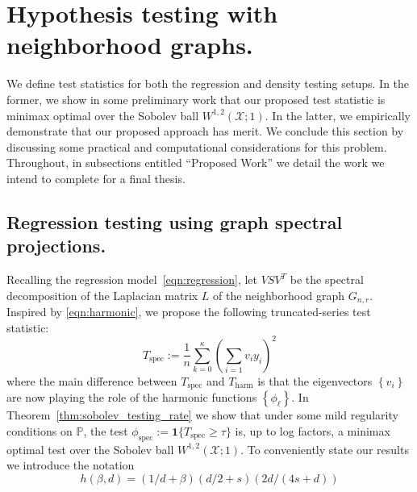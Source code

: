 \documentclass{article}
\newcommand{\set}[1]{\left\{#1\right\}}
\newcommand{\1}{\mathbf{1}}
\newcommand{\Pbb}{\mathbb{P}}
\theoremstyle{alden}
\theoremstyle{aldenthm}
\theoremstyle{definition}
\theoremstyle{remark}
\begin{document}
\section{Hypothesis testing with neighborhood graphs.}

We define test statistics for both the regression and density testing setups. In the former, we show in some preliminary work that our proposed test statistic is minimax optimal over the Sobolev ball $W^{1,2}(\mathcal{X};1)$. In the latter, we empirically demonstrate that our proposed approach has merit. We conclude this section by discussing some practical and computational considerations for this problem. Throughout, in subsections entitled ``Proposed Work'' we detail the work we intend to complete for a final thesis. 

\subsection{Regression testing using graph spectral projections.}
\label{subsec:spectral_regression_testing}

Recalling the regression model~\eqref{eqn:regression}, let $VSV^T$ be the spectral decomposition of the Laplacian matrix $L$ of the neighborhood graph $G_{n,r}$. Inspired by \eqref{eqn:harmonic}, we propose the following truncated-series test statistic:
\begin{equation}
\label{eqn:graph_spectral_projections}
T_{\mathrm{spec}} := \frac{1}{n} \sum_{k = 0}^{\kappa} \left(\sum_{i = 1} v_i y_i\right)^2
\end{equation}
where the main difference between $T_{\mathrm{spec}}$ and $T_{\mathrm{harm}}$ is that the eigenvectors $\set{v_i}$ are now playing the role of the harmonic functions $\set{\phi_{\ell}}$. In Theorem~\ref{thm:sobolev_testing_rate} we show that under some mild regularity conditions on $\Pbb$, the test $\phi_{\textrm{spec}} := \1\{T_{\mathrm{spec}} \geq \tau\}$ is, up to log factors, a minimax optimal test over the Sobolev ball $W^{1,2}(\mathcal{X};1)$. To conveniently state our results we introduce the notation
\begin{equation*}
h(\beta,d) = (1/d + \beta)(d/2 + s)(2d/(4s + d))
\end{equation*}
\end{document}
